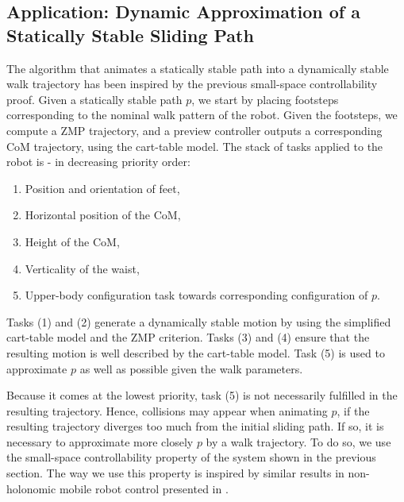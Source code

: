 \documentclass{article}
\begin{document}
\subsection{Application: Dynamic Approximation of a Statically Stable Sliding Path}
\label{sec:ssc-application}


The  algorithm   that  animates  a  statically  stable   path  into  a
dynamically stable  walk trajectory has been inspired  by the previous
small-space controllability  proof. Given a statically  stable path $p$,
we  start  by placing  footsteps  corresponding  to  the nominal  walk
pattern  of the  robot. Given the footsteps, we  compute a ZMP trajectory, 
and a preview controller outputs  a corresponding CoM trajectory, using
the cart-table model.
The stack of tasks applied to
the robot is - in decreasing priority order:

\begin{enumerate}

\item Position and orientation of  feet,

\item Horizontal position of the CoM,

\item Height of the CoM,

\item Verticality of the waist,

\item Upper-body configuration task towards corresponding
  configuration  of $p$.

\end{enumerate}

Tasks (1)  and (2) generate a  dynamically stable motion  by using the
simplified cart-table model  and the ZMP criterion. Tasks  (3) and (4)
ensure that the  resulting motion is well described  by the cart-table
model. Task (5)  is used to approximate $p$ as  well as possible given
the walk parameters.

Because it comes at the  lowest priority, task (5) is not necessarily
fulfilled in  the resulting trajectory. Hence,  collisions may appear
when animating $p$, if the resulting trajectory diverges too much from
the initial sliding  path. If so, it is  necessary to approximate more
closely $p$  by a walk  trajectory.  To do  so, we use  the small-space
controllability  property   of  the  system  shown   in  the  previous
section. The way  we use this property is  inspired by similar results
in non-holonomic mobile robot control presented in \cite{taix-94}.
\end{document}

